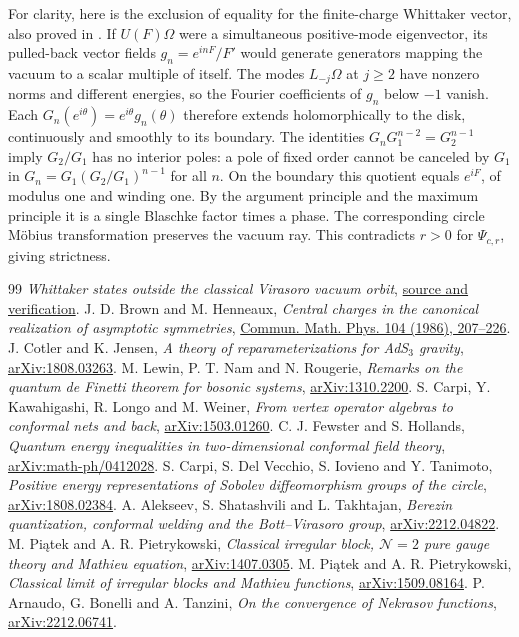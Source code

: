 \documentclass[11pt]{article}
\begin{document}
For clarity, here is the exclusion of equality for the finite-charge Whittaker vector, also proved in \cite{p34}. If \(U(F)\Omega\) were a simultaneous positive-mode eigenvector, its pulled-back vector fields \(g_n=e^{inF}/F'\) would generate generators mapping the vacuum to a scalar multiple of itself. The modes \(L_{-j}\Omega\) at \(j\ge2\) have nonzero norms and different energies, so the Fourier coefficients of \(g_n\) below \(-1\) vanish. Each \(G_n(e^{i\theta})=e^{i\theta}g_n(\theta)\) therefore extends holomorphically to the disk, continuously and smoothly to its boundary. The identities \(G_nG_1^{n-2}=G_2^{n-1}\) imply \(G_2/G_1\) has no interior poles: a pole of fixed order cannot be canceled by \(G_1\) in \(G_n=G_1(G_2/G_1)^{n-1}\) for all \(n\). On the boundary this quotient equals \(e^{iF}\), of modulus one and winding one. By the argument principle and the maximum principle it is a single Blaschke factor times a phase. The corresponding circle Möbius transformation preserves the vacuum ray. This contradicts \(r>0\) for \(\Psi_{c,r}\), giving strictness.

\begin{thebibliography}{99}
 \emph{Whittaker states outside the classical Virasoro vacuum orbit}, \href{https://github.com/g3173028019-beep/ai-automated-quantum-gravity-research/tree/main/papers/34-ads3-vacuum-stress}{source and verification}.
 J. D. Brown and M. Henneaux, \emph{Central charges in the canonical realization of asymptotic symmetries}, \href{https://doi.org/10.1007/BF01211590}{Commun. Math. Phys. 104 (1986), 207--226}.
 J. Cotler and K. Jensen, \emph{A theory of reparameterizations for AdS$_3$ gravity}, \href{https://arxiv.org/abs/1808.03263}{arXiv:1808.03263}.
 M. Lewin, P. T. Nam and N. Rougerie, \emph{Remarks on the quantum de Finetti theorem for bosonic systems}, \href{https://arxiv.org/abs/1310.2200}{arXiv:1310.2200}.
 S. Carpi, Y. Kawahigashi, R. Longo and M. Weiner, \emph{From vertex operator algebras to conformal nets and back}, \href{https://arxiv.org/abs/1503.01260}{arXiv:1503.01260}.
 C. J. Fewster and S. Hollands, \emph{Quantum energy inequalities in two-dimensional conformal field theory}, \href{https://arxiv.org/abs/math-ph/0412028}{arXiv:math-ph/0412028}.
 S. Carpi, S. Del Vecchio, S. Iovieno and Y. Tanimoto, \emph{Positive energy representations of Sobolev diffeomorphism groups of the circle}, \href{https://arxiv.org/abs/1808.02384}{arXiv:1808.02384}.
 A. Alekseev, S. Shatashvili and L. Takhtajan, \emph{Berezin quantization, conformal welding and the Bott--Virasoro group}, \href{https://arxiv.org/abs/2212.04822}{arXiv:2212.04822}.
 M. Pi\k atek and A. R. Pietrykowski, \emph{Classical irregular block, \(\mathcal N=2\) pure gauge theory and Mathieu equation}, \href{https://arxiv.org/abs/1407.0305}{arXiv:1407.0305}.
 M. Pi\k atek and A. R. Pietrykowski, \emph{Classical limit of irregular blocks and Mathieu functions}, \href{https://arxiv.org/abs/1509.08164}{arXiv:1509.08164}.
 P. Arnaudo, G. Bonelli and A. Tanzini, \emph{On the convergence of Nekrasov functions}, \href{https://arxiv.org/abs/2212.06741}{arXiv:2212.06741}.
\end{thebibliography}
\end{document}
